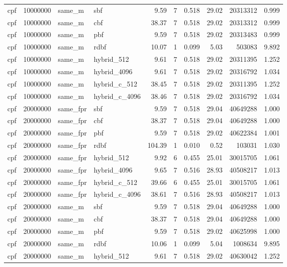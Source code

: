 \begin{tabular}{llllrrrrrr}
cpf & 10000000 & same\_m & sbf & 9.59 & 7 & 0.518 & 29.02 & 20313312 & 0.999 \\
cpf & 10000000 & same\_m & cbf & 38.37 & 7 & 0.518 & 29.02 & 20313312 & 0.999 \\
cpf & 10000000 & same\_m & pbf & 9.59 & 7 & 0.518 & 29.02 & 20313483 & 0.999 \\
cpf & 10000000 & same\_m & rdbf & 10.07 & 1 & 0.099 & 5.03 & 503083 & 9.892 \\
cpf & 10000000 & same\_m & hybrid\_512 & 9.61 & 7 & 0.518 & 29.02 & 20311395 & 1.252 \\
cpf & 10000000 & same\_m & hybrid\_4096 & 9.61 & 7 & 0.518 & 29.02 & 20316792 & 1.034 \\
cpf & 10000000 & same\_m & hybrid\_c\_512 & 38.45 & 7 & 0.518 & 29.02 & 20311395 & 1.252 \\
cpf & 10000000 & same\_m & hybrid\_c\_4096 & 38.46 & 7 & 0.518 & 29.02 & 20316792 & 1.034 \\
cpf & 20000000 & same\_fpr & sbf & 9.59 & 7 & 0.518 & 29.04 & 40649288 & 1.000 \\
cpf & 20000000 & same\_fpr & cbf & 38.37 & 7 & 0.518 & 29.04 & 40649288 & 1.000 \\
cpf & 20000000 & same\_fpr & pbf & 9.59 & 7 & 0.518 & 29.02 & 40622384 & 1.001 \\
cpf & 20000000 & same\_fpr & rdbf & 104.39 & 1 & 0.010 & 0.52 & 103031 & 1.030 \\
cpf & 20000000 & same\_fpr & hybrid\_512 & 9.92 & 6 & 0.455 & 25.01 & 30015705 & 1.061 \\
cpf & 20000000 & same\_fpr & hybrid\_4096 & 9.65 & 7 & 0.516 & 28.93 & 40508217 & 1.013 \\
cpf & 20000000 & same\_fpr & hybrid\_c\_512 & 39.66 & 6 & 0.455 & 25.01 & 30015705 & 1.061 \\
cpf & 20000000 & same\_fpr & hybrid\_c\_4096 & 38.61 & 7 & 0.516 & 28.93 & 40508217 & 1.013 \\
cpf & 20000000 & same\_m & sbf & 9.59 & 7 & 0.518 & 29.04 & 40649288 & 1.000 \\
cpf & 20000000 & same\_m & cbf & 38.37 & 7 & 0.518 & 29.04 & 40649288 & 1.000 \\
cpf & 20000000 & same\_m & pbf & 9.59 & 7 & 0.518 & 29.02 & 40625998 & 1.000 \\
cpf & 20000000 & same\_m & rdbf & 10.06 & 1 & 0.099 & 5.04 & 1008634 & 9.895 \\
cpf & 20000000 & same\_m & hybrid\_512 & 9.61 & 7 & 0.518 & 29.02 & 40630042 & 1.252 \\

\end{tabular}
